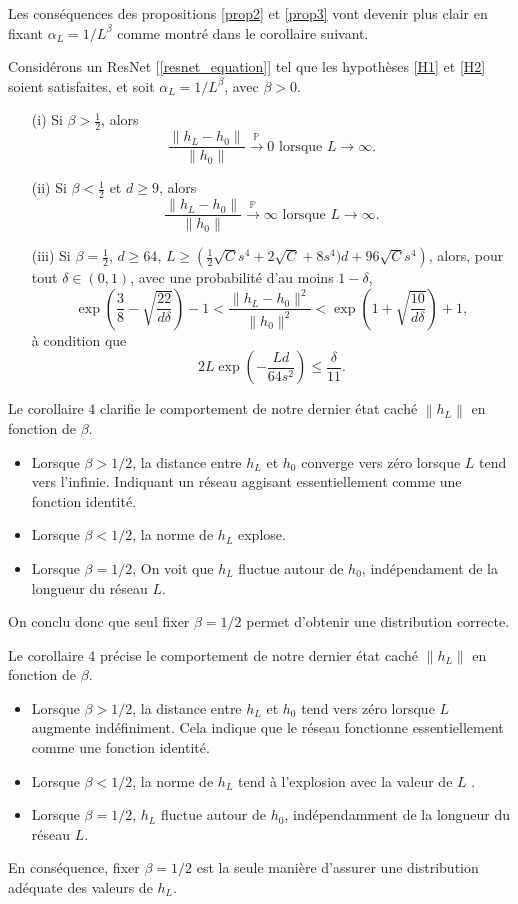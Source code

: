 Les conséquences des propositions \ref{prop2} et \ref{prop3} vont devenir plus clair en fixant $ \alpha _L = 1/L ^\beta $ comme montré dans le corollaire suivant.
\begin{cor}\label{cor4}
    Considérons un ResNet [\ref{resnet_equation}] tel que les hypothèses \ref{H1} et \ref{H2} soient satisfaites, et soit $ \alpha_L = 1/L^\beta $, avec $ \beta > 0 $.
    \begin{itemize}
        \item[(i)] Si $ \beta > \frac{1}{2} $, alors
        \[
            \frac{\|h_L - h_0\|}{\|h_0\|} \xrightarrow{\mathbb{P}} 0 \text{ lorsque } L \to \infty.
        \]
        \item[(ii)] Si $ \beta < \frac{1}{2}$ et $d \geq 9 $, alors
        \[
            \frac{\|h_L - h_0\|}{\|h_0\|} \xrightarrow{\mathbb{P}} \infty \text{ lorsque } L \to \infty.
        \]
        \item[(iii)] Si $ \beta = \frac{1}{2} $, $ d \geq 64$, $L \geq \left(\frac{1}{2}\sqrt{C}s^4 + 2\sqrt{C} + 8s^4)d + 96\sqrt{C}s^4\right) $, alors, pour tout $ \delta \in (0, 1) $, avec une probabilité d'au moins $ 1 - \delta $,
        \[
            \exp\left(\frac{3}{8} - \sqrt{\frac{22}{d\delta}}\right) - 1 < \frac{\|h_L - h_0\|^2}{\|h_0\|^2} < \exp\left(1 + \sqrt{\frac{10}{d\delta}}\right) + 1,
        \]
        à condition que
        \[
            2L \exp\left(-\frac{Ld}{64s^2}\right) \leq \frac{\delta}{11}.
        \]
    \end{itemize}
\end{cor}
Le corollaire 4 clarifie le comportement de notre dernier état caché $ \left\| h_L \right\|  $ en fonction de $ \beta  $. 
\begin{itemize}
    \item Lorsque $ \beta > 1/2 $, la distance entre $ h_L $ et $ h_0 $ converge vers zéro lorsque $ L $ tend vers l'infinie. Indiquant un réseau aggisant essentiellement comme une fonction identité.
    \item Lorsque $ \beta < 1/2 $, la norme de $ h_L $ explose.
    \item Lorsque $ \beta = 1/2 $, On voit que $ h_L $ fluctue autour de $ h_0 $, indépendament de la longueur du réseau $ L $.
\end{itemize}
On conclu donc que seul fixer $ \beta = 1/2 $ permet d'obtenir une distribution correcte.

Le corollaire 4 précise le comportement de notre dernier état caché $\left\| h_L \right\|$ en fonction de $\beta$.
\begin{itemize}
    \item Lorsque $\beta > 1/2$, la distance entre $h_L$ et $h_0$ tend vers zéro lorsque $L$ augmente indéfiniment. Cela indique que le réseau fonctionne essentiellement comme une fonction identité.
    \item Lorsque $\beta < 1/2$, la norme de $h_L$ tend à l'explosion avec la valeur de $ L $ .
    \item Lorsque $\beta = 1/2$, $h_L$ fluctue autour de $h_0$, indépendamment de la longueur du réseau $L$.
\end{itemize}
En conséquence, fixer $\beta = 1/2$ est la seule manière d'assurer une distribution adéquate des valeurs de $h_L$.


